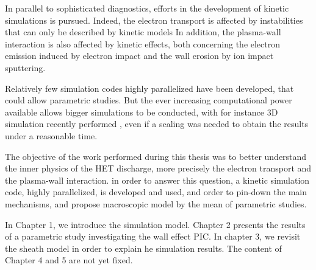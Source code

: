 In parallel to sophisticated diagnostics, efforts in the development of kinetic simulations is pursued.
Indeed, the electron transport is affected by instabilities that can only be described by kinetic models \citep{adam2008a,lafleur2016a}
In addition, the plasma-wall interaction is also affected by kinetic effects, both concerning the electron emission induced by electron impact \citep{barral2003a,raitses2011,sydorenko2006} and the wall erosion by ion impact sputtering.

Relatively few simulation codes highly parallelized have been developed, that could allow parametric studies.
But the ever increasing computational power available allows bigger simulations to be conducted, with for instance \ac{3D} simulation recently performed \citep{fubiani2018,taccogna2012}, even if a scaling was needed to obtain the results under a reasonable time.

The objective of the work performed during this thesis was to better understand the inner physics of the \ac{HET} discharge, more precisely the electron transport and the plasma-wall interaction. 
in order to answer this question, a kinetic simulation code, highly parallelized, is developed and used, and order to pin-down the main mechanisms, and propose macroscopic model by the mean of parametric studies.

\vspace{1em}
In Chapter 1, we introduce the simulation model.
Chapter 2 presents the results of a parametric study investigating the wall effect PIC.
In chapter 3, we revisit the sheath model in order to explain he simulation results.
The content of Chapter 4 and 5 are not yet fixed.
